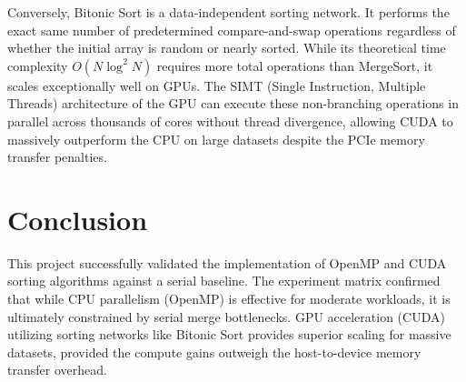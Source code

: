 \documentclass[12pt, a4paper]{article}
\begin{document}
Conversely, Bitonic Sort is a data-independent sorting network. It performs the exact same number of predetermined compare-and-swap operations regardless of whether the initial array is random or nearly sorted. While its theoretical time complexity $O(N \log^2 N)$ requires more total operations than MergeSort, it scales exceptionally well on GPUs. The SIMT (Single Instruction, Multiple Threads) architecture of the GPU can execute these non-branching operations in parallel across thousands of cores without thread divergence, allowing CUDA to massively outperform the CPU on large datasets despite the PCIe memory transfer penalties.

\section{Conclusion}
This project successfully validated the implementation of OpenMP and CUDA sorting algorithms against a serial baseline. The experiment matrix confirmed that while CPU parallelism (OpenMP) is effective for moderate workloads, it is ultimately constrained by serial merge bottlenecks. GPU acceleration (CUDA) utilizing sorting networks like Bitonic Sort provides superior scaling for massive datasets, provided the compute gains outweigh the host-to-device memory transfer overhead.
\end{document}
